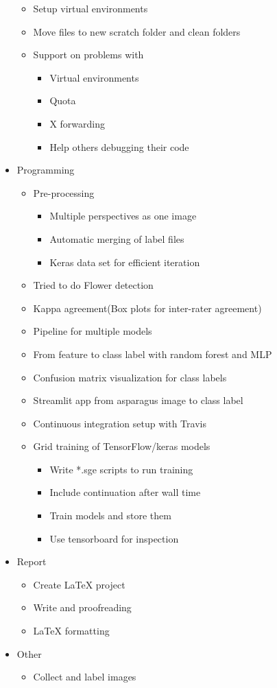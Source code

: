\begin{itemize}
\begin{itemize}
\item Setup virtual environments
\item Move files to new scratch folder and clean folders
\item Support on problems with
\begin{itemize}
\item Virtual environments
\item Quota
\item X forwarding
\item Help others debugging their code
\end{itemize}
\end{itemize}
\item Programming
\begin{itemize}
\item Pre-processing
\begin{itemize}
\item Multiple perspectives as one image
\item Automatic merging of label files
\item Keras data set for efficient iteration
\end{itemize}
\item Tried to do Flower detection
\item Kappa agreement(Box plots for inter-rater agreement)
\item Pipeline for multiple models
\item From feature to class label with random forest and MLP
\item Confusion matrix visualization for class labels
\item Streamlit app from asparagus image to class label
\item Continuous integration setup with Travis
\item Grid training of TensorFlow/keras models
\begin{itemize}
\item Write *.sge scripts to run training
\item Include continuation after wall time
\item Train models and store them
\item Use tensorboard for inspection
\end{itemize}
\end{itemize}
\item Report
\begin{itemize}
\item Create LaTeX project
\item Write and proofreading
\item LaTeX formatting
\end{itemize}
\item Other
\begin{itemize}
\item Collect and label images
\end{itemize}
\end{itemize}


